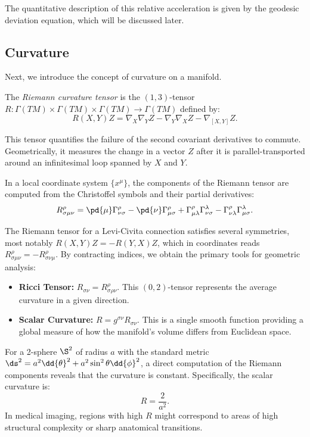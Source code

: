 The quantitative description of this relative acceleration is given by the geodesic deviation equation, which will be discussed later.

\subsection{Curvature} Next, we introduce the concept of curvature on a manifold.

\begin{definition}
  The \emph{Riemann curvature tensor} is the $(1,3)$-tensor $R: \Gamma(TM) \times \Gamma(TM) \times \Gamma(TM) \to \Gamma(TM)$ defined by:
  \begin{equation}
    R(X,Y)Z = \nabla_X \nabla_Y Z - \nabla_Y \nabla_X Z - \nabla_{[X,Y]} Z
  .\end{equation}
\end{definition}

This tensor quantifies the failure of the second covariant derivatives to commute. Geometrically, it measures the change in a vector $Z$ after it is parallel-transported around an infinitesimal loop spanned by $X$ and $Y$.

In a local coordinate system $\{x^\mu\}$, the components of the Riemann tensor are computed from the Christoffel symbols and their partial derivatives:
\[%
  R^\rho_{\sigma\mu\nu} = \pd{\mu} \Gamma^\rho_{\nu\sigma} - \pd{\nu} \Gamma^\rho_{\mu\sigma} + \Gamma^\rho_{\mu\lambda} \Gamma^\lambda_{\nu\sigma} - \Gamma^\rho_{\nu\lambda} \Gamma^\lambda_{\mu\sigma}
.\]%

The Riemann tensor for a Levi-Civita connection satisfies several symmetries, most notably $R(X,Y)Z = -R(Y,X)Z$, which in coordinates reads $R^\rho_{\sigma\mu\nu} = -R^\rho_{\sigma\nu\mu}$. By contracting indices, we obtain the primary tools for geometric analysis:
\begin{itemize}
  \item \textbf{Ricci Tensor:} $R_{\sigma\nu} = R^\rho_{\sigma\rho\nu}$. This $(0,2)$-tensor represents the average curvature in a given direction.
  \item \textbf{Scalar Curvature:} $R = g^{\sigma\nu} R_{\sigma\nu}$. This is a single smooth function providing a global measure of how the manifold's volume differs from Euclidean space.
\end{itemize}

\begin{example}
  For a 2-sphere $\S^2$ of radius $a$ with the standard metric $\ds^2 = a^2 \dd{\theta}^2 + a^2 \sin^2 \theta \dd{\phi}^2$, a direct computation of the Riemann components reveals that the curvature is constant. Specifically, the scalar curvature is:
  \[%
    R = \frac{2}{a^2}
  .\]%
  In medical imaging, regions with high $R$ might correspond to areas of high structural complexity or sharp anatomical transitions.
\end{example}

